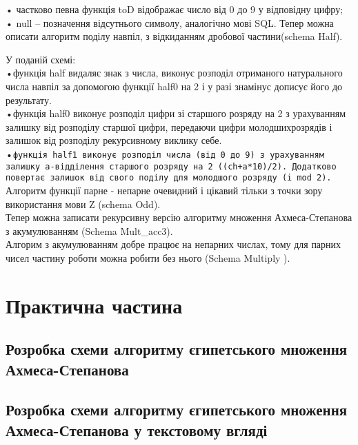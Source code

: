\documentclass {report}
\begin{document}
 • частково певна функція toD відображає число від 0 до 9 у відповідну цифру;\\

• null – позначення відсутнього символу, аналогічно мові SQL. Тепер можна описати алгоритм поділу навпіл, з відкиданням дробової частини(schema  Half).


У поданій схемі:\\

•функція half видаляє знак з числа, виконує розподіл отриманого натурального числа навпіл за допомогою функції half0 на 2 і у разі знамінус дописує його до результату.\\

•функція half0 виконує розподіл цифри зі старшого розряду на 2 з урахуванням залишку від розподілу старшої цифри, передаючи цифри молодшихрозрядів і залишок від розподілу рекурсивному виклику себе.\\

•\texttt{функція half1 виконує розподіл числа (від 0 до 9) з урахуванням залишку a-відділення старшого розряду на 2 ((ch+a*10)/2). Додатково повертає залишок від свого поділу для молодшого розряду (i mod 2).}\\

Алгоритм функції парне - непарне очевидний і цікавий тільки з точки зору використання мови Z (schema Odd).\\

Тепер можна записати рекурсивну версію алгоритму множення Ахмеса-Степанова з акумулюванням (Schema Mult\_acc3).\\

Алгорим з акумулюванням добре працює на непарних числах, тому для парних чисел частину роботи можна робити без нього (Schema Multiply ).\\
\chapter{Практична частина}
\section {Розробка схеми алгоритму єгипетського множення Ахмеса-Степанова}

\section {Розробка схеми алгоритму єгипетського множення Ахмеса-Степанова у текстовому вгляді}

\cite{author2}
\printindex
\cite{author1}
\renewcommand\bibname{Перелік джерел посилання}


\end{document}

